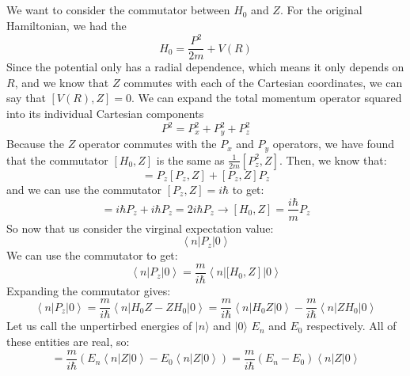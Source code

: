 \documentclass[12pt]{article}
\begin{document}
\subsection{}
We want to consider the commutator between $H_0$ and $Z$. For the original Hamiltonian, we had the 
\begin{equation}
  H_{0}=\frac{P^{2}}{2m}+V(R)
\end{equation}
Since the potential only has a radial dependence, which means it only depends on $R$, and we know that $Z$ commutes with each of the Cartesian coordinates, we can say that $[V(R),Z]=0$.
We can expand the total momentum operator squared into its individual Cartesian components
\begin{equation}
  P^{2}=P_{x}^{2}+P_{y}^{2}+P_{z}^{2}
\end{equation}
Because the $Z$ operator commutes with the $P_{x}$ and $P_{y}$ operators, we have found that the commutator $[H_0,Z]$ is the same as $\frac{1}{2m}[P_{z}^{2},Z]$. Then, we know that:
\begin{equation}
  [P_{z}^{2},Z]=P_{z}[P_{z},Z]+[P_{z},Z]P_{z}
\end{equation}
and we can use the commutator $[P_{z},Z]=i\hbar$ to get:
\begin{equation}
  [P_{z}^{2},Z]=i\hbar P_{z}+i\hbar P_{z}=2i\hbar P_{z} \rightarrow [H_0,Z]=\frac{i\hbar}{m} P_{z}
\end{equation}
So now that us consider the virginal expectation value:
\begin{equation}
  \left\langle n\left|P_{z}\right| 0\right\rangle
\end{equation}
We can use the commutator to get:
\begin{equation}
  \left\langle n\left|P_{z}\right| 0\right\rangle = \frac{m}{i\hbar}\left\langle n\left|[H_0,Z\right]| 0\right\rangle
\end{equation}
Expanding the commutator gives:
\begin{equation}
  \left\langle n\left|P_{z}\right| 0\right\rangle = \frac{m}{i\hbar}\left\langle n\left|H_0Z-ZH_0\right| 0\right\rangle = \frac{m}{i\hbar}\left\langle n\left|H_0Z\right| 0\right\rangle - \frac{m}{i\hbar}\left\langle n\left|ZH_0\right| 0\right\rangle
\end{equation}
Let us call the unpertirbed energies of $|n\rangle$ and $|0\rangle$ $E_n$ and $E_0$ respectively. All of these entities are real, so:
\begin{equation}
  = \frac{m}{i\hbar}\left(E_n\left\langle n\left|Z\right| 0\right\rangle - E_0\left\langle n\left|Z\right| 0\right\rangle\right) = \frac{m}{i\hbar}\left(E_n-E_0\right)\left\langle n\left|Z\right| 0\right\rangle
\end{equation}
\end{document}
